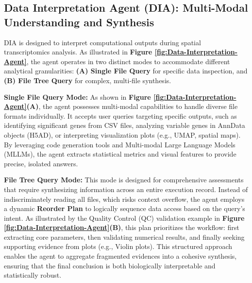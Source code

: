 \documentclass[a4,center,fleqn]{NAR}
\begin{document}
\subsection{Data Interpretation Agent (DIA): Multi-Modal Understanding and Synthesis}

DIA is designed to interpret computational outputs during spatial transcriptomics analysis. As illustrated in \textbf{Figure \ref{fig:Data-Interpretation-Agent}}, the agent operates in two distinct modes to accommodate different analytical granularities: \textbf{(A) Single File Query} for specific data inspection, and \textbf{(B) File Tree Query} for complex, multi-file synthesis.

\textbf{Single File Query Mode:} As shown in \textbf{Figure \ref{fig:Data-Interpretation-Agent}(A)}, the agent possesses multi-modal capabilities to handle diverse file formats individually. It accepts user queries targeting specific outputs, such as identifying significant genes from CSV files, analyzing variable genes in AnnData objects (H5AD), or interpreting visualization plots (e.g., UMAP, spatial maps). By leveraging code generation tools and Multi-modal Large Language Models (MLLMs), the agent extracts statistical metrics and visual features to provide precise, isolated answers.

\textbf{File Tree Query Mode:} This mode is designed for comprehensive assessments that require synthesizing information across an entire execution record. Instead of indiscriminately reading all files, which risks context overflow, the agent employs a dynamic \textbf{Reorder Plan} to logically sequence data access based on the query's intent. As illustrated by the Quality Control (QC) validation example in \textbf{Figure \ref{fig:Data-Interpretation-Agent}(B)}, this plan prioritizes the workflow: first extracting core parameters, then validating numerical results, and finally seeking supporting evidence from plots (e.g., Violin plots). This structured approach enables the agent to aggregate fragmented evidences into a cohesive synthesis, ensuring that the final conclusion is both biologically interpretable and statistically robust.
\end{document}
